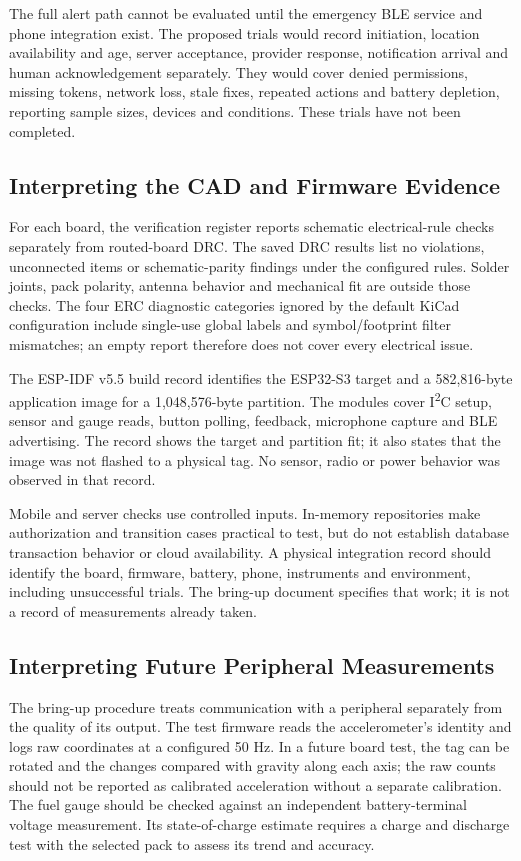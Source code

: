 \documentclass[nolineno]{ieeeaccess}
\begin{document}
The full alert path cannot be evaluated until the emergency BLE service and phone integration exist. The proposed trials would record initiation, location availability and age, server acceptance, provider response, notification arrival and human acknowledgement separately. They would cover denied permissions, missing tokens, network loss, stale fixes, repeated actions and battery depletion, reporting sample sizes, devices and conditions. These trials have not been completed.


\subsection{Interpreting the CAD and Firmware Evidence}
For each board, the verification register reports schematic electrical-rule checks separately from routed-board DRC. The saved DRC results list no violations, unconnected items or schematic-parity findings under the configured rules. Solder joints, pack polarity, antenna behavior and mechanical fit are outside those checks. The four ERC diagnostic categories ignored by the default KiCad configuration include single-use global labels and symbol/footprint filter mismatches; an empty report therefore does not cover every electrical issue.

The ESP-IDF v5.5 build record identifies the ESP32-S3 target and a 582,816-byte application image for a 1,048,576-byte partition. The modules cover I\textsuperscript{2}C setup, sensor and gauge reads, button polling, feedback, microphone capture and BLE advertising. The record shows the target and partition fit; it also states that the image was not flashed to a physical tag. No sensor, radio or power behavior was observed in that record.

Mobile and server checks use controlled inputs. In-memory repositories make authorization and transition cases practical to test, but do not establish database transaction behavior or cloud availability. A physical integration record should identify the board, firmware, battery, phone, instruments and environment, including unsuccessful trials. The bring-up document specifies that work; it is not a record of measurements already taken.


\subsection{Interpreting Future Peripheral Measurements}
The bring-up procedure treats communication with a peripheral separately from the quality of its output. The test firmware reads the accelerometer's identity and logs raw coordinates at a configured 50 Hz. In a future board test, the tag can be rotated and the changes compared with gravity along each axis; the raw counts should not be reported as calibrated acceleration without a separate calibration. The fuel gauge should be checked against an independent battery-terminal voltage measurement. Its state-of-charge estimate requires a charge and discharge test with the selected pack to assess its trend and accuracy.
\end{document}

